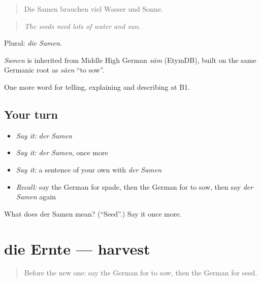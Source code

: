 \begin{quote}
Die Samen brauchen viel Wasser und Sonne.
\end{quote}

\begin{quote}
\emph{The seeds need lots of water and sun.}
\end{quote}

Plural: \emph{die Samen}.

\begin{cousinweb}
\emph{Samen} is inherited from Middle High German \emph{sām} (EtymDB), built on the same Germanic root as \emph{säen} \textquotedblleft{}to sow\textquotedblright{}.
\end{cousinweb}

\begin{grammarlens}[title={What you've built}]
One more word for telling, explaining and describing at B1.
\end{grammarlens}

\subsection*{Your turn}
\begin{itemize}
\raggedright
  \item \emph{Say it:} \emph{der Samen}
  \item \emph{Say it:} \emph{der Samen}, once more
  \item \emph{Say it:} a sentence of your own with \emph{der Samen}
  \item \emph{Recall:} say the German for spade, then the German for to sow, then say \emph{der Samen} again
\end{itemize}

\begin{tcolorbox}[breakable,colback=teal!4,colframe=teal!35!black,title={Before you move on}]
What does der Samen mean? (\textquotedblleft{}Seed\textquotedblright{}.) Say it once more.
\end{tcolorbox}
\section[die Ernte]{die Ernte — harvest}

\label{lesson:GE-C504-ernte}



\begin{quote}
Before the new one: say the German for to sow, then the German for seed.
\end{quote}

